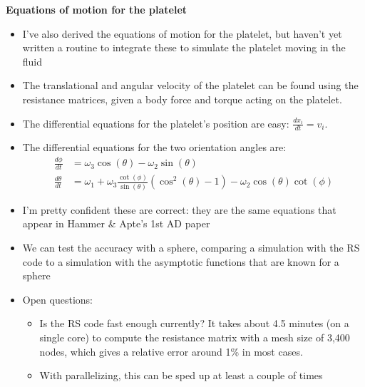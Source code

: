 \documentclass{article}
\begin{document}
\textbf{Equations of motion for the platelet}
\begin{itemize}
\item I've also derived the equations of motion for the platelet, but
  haven't yet written a routine to integrate these to simulate the
  platelet moving in the fluid
\item The translational and angular velocity of the platelet can be
  found using the resistance matrices, given a body force and torque
  acting on the platelet.
\item The differential equations for the platelet's position are easy:
  $\frac{dx_i}{dt} = v_i$.
\item The differential equations for the two orientation angles are:
  \begin{align*}
    \frac{d\phi}{dt} &= \omega_3 \cos(\theta) - \omega_2 \sin(\theta)
    \\
    \frac{d\theta}{dt} &= \omega_1 + \omega_3
                         \frac{\cot(\phi)}{\sin(\theta)}
                         (\cos^2(\theta) - 1) - \omega_2 \cos(\theta)
                         \cot(\phi) 
  \end{align*}
\item I'm pretty confident these are correct: they are the same
  equations that appear in Hammer \& Apte's 1st AD paper
  \cite{Hammer1992}
\item We can test the accuracy with a sphere, comparing a simulation
  with the RS code to a simulation with the asymptotic functions that
  are known for a sphere
\item Open questions: 
  \begin{itemize}
  \item Is the RS code fast enough currently? It takes about 4.5
    minutes (on a single core) to compute the resistance matrix with a
    mesh size of 3,400 nodes, which gives a relative error around 1\%
    in most cases.
  \item With parallelizing, this can be sped up at least a couple of
    times
  \end{itemize}
\end{itemize}



\end{document}
